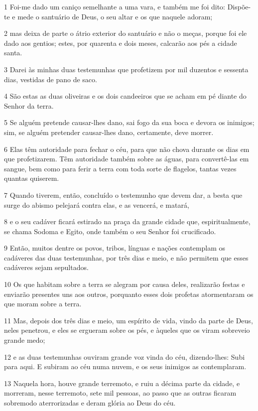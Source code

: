 \par 1 Foi-me dado um caniço semelhante a uma vara, e também me foi dito: Dispõe-te e mede o santuário de Deus, o seu altar e os que naquele adoram;
\par 2 mas deixa de parte o átrio exterior do santuário e não o meças, porque foi ele dado aos gentios; estes, por quarenta e dois meses, calcarão aos pés a cidade santa.
\par 3 Darei às minhas duas testemunhas que profetizem por mil duzentos e sessenta dias, vestidas de pano de saco.
\par 4 São estas as duas oliveiras e os dois candeeiros que se acham em pé diante do Senhor da terra.
\par 5 Se alguém pretende causar-lhes dano, sai fogo da sua boca e devora os inimigos; sim, se alguém pretender causar-lhes dano, certamente, deve morrer.
\par 6 Elas têm autoridade para fechar o céu, para que não chova durante os dias em que profetizarem. Têm autoridade também sobre as águas, para convertê-las em sangue, bem como para ferir a terra com toda sorte de flagelos, tantas vezes quantas quiserem.
\par 7 Quando tiverem, então, concluído o testemunho que devem dar, a besta que surge do abismo pelejará contra elas, e as vencerá, e matará,
\par 8 e o seu cadáver ficará estirado na praça da grande cidade que, espiritualmente, se chama Sodoma e Egito, onde também o seu Senhor foi crucificado.
\par 9 Então, muitos dentre os povos, tribos, línguas e nações contemplam os cadáveres das duas testemunhas, por três dias e meio, e não permitem que esses cadáveres sejam sepultados.
\par 10 Os que habitam sobre a terra se alegram por causa deles, realizarão festas e enviarão presentes uns aos outros, porquanto esses dois profetas atormentaram os que moram sobre a terra.
\par 11 Mas, depois dos três dias e meio, um espírito de vida, vindo da parte de Deus, neles penetrou, e eles se ergueram sobre os pés, e àqueles que os viram sobreveio grande medo;
\par 12 e as duas testemunhas ouviram grande voz vinda do céu, dizendo-lhes: Subi para aqui. E subiram ao céu numa nuvem, e os seus inimigos as contemplaram.
\par 13 Naquela hora, houve grande terremoto, e ruiu a décima parte da cidade, e morreram, nesse terremoto, sete mil pessoas, ao passo que as outras ficaram sobremodo aterrorizadas e deram glória ao Deus do céu.
